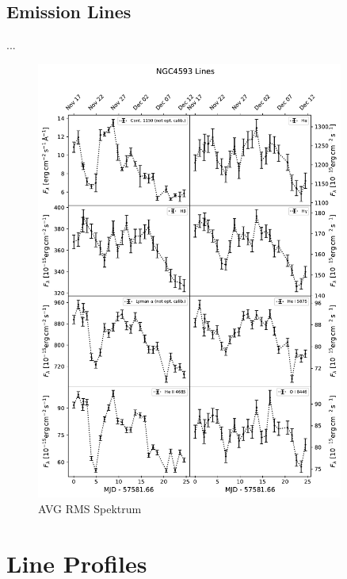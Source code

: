 \subsection{Emission Lines}
...
\begin{figure}[!ht]
	\centering
	\includegraphics[width=0.9\textwidth]{pictures/Chapter4/lightcurves/NGC4593_Lines.pdf}
	\caption{AVG RMS Spektrum}
	\label{fig:emission_line_lightcurves}
\end{figure}

\section{Line Profiles}

